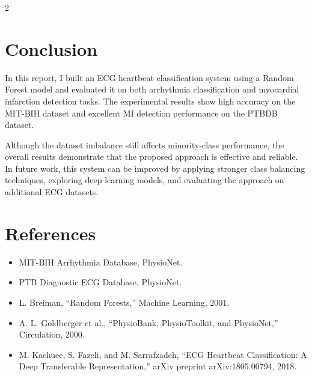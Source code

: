 \documentclass[10pt,a4paper]{article}
\begin{document}
\begin{multicols}{2}
\section{Conclusion}
In this report, I built an ECG heartbeat classification system using a Random Forest model and evaluated it on both arrhythmia classification and myocardial infarction detection tasks. The experimental results show high accuracy on the MIT-BIH dataset and excellent MI detection performance on the PTBDB dataset.

Although the dataset imbalance still affects minority-class performance, the overall results demonstrate that the proposed approach is effective and reliable. In future work, this system can be improved by applying stronger class balancing techniques, exploring deep learning models, and evaluating the approach on additional ECG datasets.

\section*{References}
\begin{itemize}
    \item MIT-BIH Arrhythmia Database, PhysioNet.
    \item PTB Diagnostic ECG Database, PhysioNet.
    \item L. Breiman, ``Random Forests,'' Machine Learning, 2001.
    \item A. L. Goldberger et al., ``PhysioBank, PhysioToolkit, and PhysioNet,'' Circulation, 2000.
    \item M. Kachuee, S. Fazeli, and M. Sarrafzadeh, ``ECG Heartbeat Classification: A Deep Transferable Representation,'' arXiv preprint arXiv:1805.00794, 2018.
\end{itemize}

\end{multicols}
\end{document}
